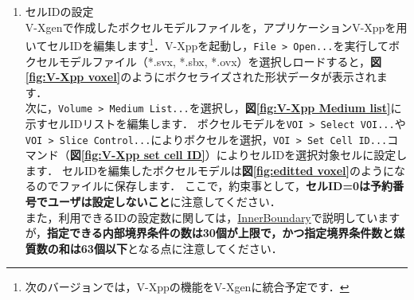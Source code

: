 \begin{enumerate}
\item セルIDの設定\\
V-Xgenで作成したボクセルモデルファイルを，アプリケーションV-Xppを用いてセルIDを編集します\footnote{次のバージョンでは，V-Xppの機能をV-Xgenに統合予定です．}．V-Xppを起動し，\verb|File > Open...|を実行してボクセルモデルファイル（*.svx, *.sbx, *.ovx）を選択しロードすると，\textbf{図\ref{fig:V-Xpp voxel}}のようにボクセライズされた形状データが表示されます．\\

 次に，\verb|Volume > Medium List...|を選択し，\textbf{図\ref{fig:V-Xpp Medium list}}に示すセルIDリストを編集します．
ボクセルモデルを\verb|VOI > Select VOI...|や\verb|VOI > Slice Control...|によりボクセルを選択，\verb|VOI > Set Cell ID...|コマンド（\textbf{図\ref{fig:V-Xpp set cell ID}}）によりセルIDを選択対象セルに設定します．
セルIDを編集したボクセルモデルは\textbf{図\ref{fig:editted voxel}}のようになるのでファイルに保存します．
ここで，約束事として，\textbf{セルID=0は予約番号でユーザは設定しないこと}に注意してください．\\

また，利用できるIDの設定数に関しては，\hyperlink{tgt:innerboundary}{InnerBoundary}で説明していますが，\textbf{指定できる内部境界条件の数は30個が上限で，かつ指定境界条件数と媒質数の和は63個以下}となる点に注意してください．


\end{enumerate}
